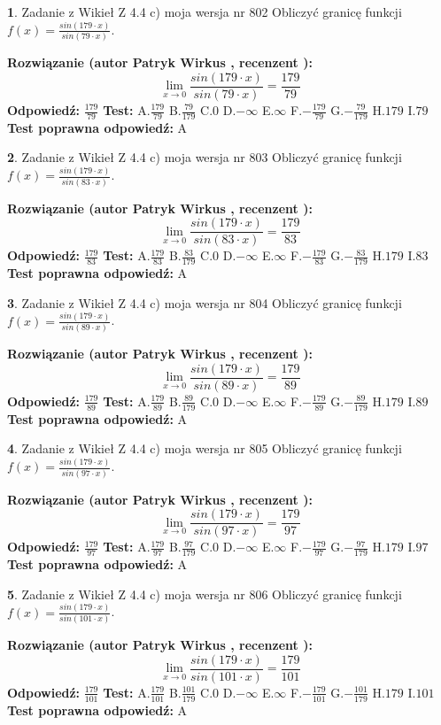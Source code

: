 \documentclass[12pt, a4paper]{article}
\theoremstyle{definition} %
\newtheorem{zad}{}
\newcommand{\zadStart}[1]{\begin{zad}#1\newline}
\newcommand{\zadStop}{\end{zad}}
\newcommand{\rozwStart}[2]{\noindent \textbf{Rozwiązanie (autor #1 , recenzent #2): }\newline}
\newcommand{\rozwStop}{\newline}
\newcommand{\odpStart}{\noindent \textbf{Odpowiedź:}\newline}
\newcommand{\odpStop}{\newline}
\newcommand{\testStart}{\noindent \textbf{Test:}\newline}
\newcommand{\testStop}{\newline}
\newcommand{\kluczStart}{\noindent \textbf{Test poprawna odpowiedź:}\newline}
\newcommand{\kluczStop}{\newline}
\begin{document}
\zadStart{Zadanie z Wikieł Z 4.4 c) moja wersja nr 802}
Obliczyć granicę funkcji $f(x)=\frac{sin(179\cdot x)}{sin(79\cdot x)}$.
\zadStop
\rozwStart{Patryk Wirkus}{}
$$\lim\limits_{x\to 0}\frac{sin(179\cdot x)}{sin(79\cdot x)}=
\frac{179}{79}$$
\rozwStop
\odpStart
$\frac{179}{79}$
\odpStop
\testStart
A.$\frac{179}{79}$
B.$\frac{79}{179}$
C.$0$
D.$-\infty$
E.$\infty$
F.$-\frac{179}{79}$
G.$-\frac{79}{179}$
H.$179$
I.$79$
\testStop
\kluczStart
A
\kluczStop



\zadStart{Zadanie z Wikieł Z 4.4 c) moja wersja nr 803}
Obliczyć granicę funkcji $f(x)=\frac{sin(179\cdot x)}{sin(83\cdot x)}$.
\zadStop
\rozwStart{Patryk Wirkus}{}
$$\lim\limits_{x\to 0}\frac{sin(179\cdot x)}{sin(83\cdot x)}=
\frac{179}{83}$$
\rozwStop
\odpStart
$\frac{179}{83}$
\odpStop
\testStart
A.$\frac{179}{83}$
B.$\frac{83}{179}$
C.$0$
D.$-\infty$
E.$\infty$
F.$-\frac{179}{83}$
G.$-\frac{83}{179}$
H.$179$
I.$83$
\testStop
\kluczStart
A
\kluczStop



\zadStart{Zadanie z Wikieł Z 4.4 c) moja wersja nr 804}
Obliczyć granicę funkcji $f(x)=\frac{sin(179\cdot x)}{sin(89\cdot x)}$.
\zadStop
\rozwStart{Patryk Wirkus}{}
$$\lim\limits_{x\to 0}\frac{sin(179\cdot x)}{sin(89\cdot x)}=
\frac{179}{89}$$
\rozwStop
\odpStart
$\frac{179}{89}$
\odpStop
\testStart
A.$\frac{179}{89}$
B.$\frac{89}{179}$
C.$0$
D.$-\infty$
E.$\infty$
F.$-\frac{179}{89}$
G.$-\frac{89}{179}$
H.$179$
I.$89$
\testStop
\kluczStart
A
\kluczStop



\zadStart{Zadanie z Wikieł Z 4.4 c) moja wersja nr 805}
Obliczyć granicę funkcji $f(x)=\frac{sin(179\cdot x)}{sin(97\cdot x)}$.
\zadStop
\rozwStart{Patryk Wirkus}{}
$$\lim\limits_{x\to 0}\frac{sin(179\cdot x)}{sin(97\cdot x)}=
\frac{179}{97}$$
\rozwStop
\odpStart
$\frac{179}{97}$
\odpStop
\testStart
A.$\frac{179}{97}$
B.$\frac{97}{179}$
C.$0$
D.$-\infty$
E.$\infty$
F.$-\frac{179}{97}$
G.$-\frac{97}{179}$
H.$179$
I.$97$
\testStop
\kluczStart
A
\kluczStop



\zadStart{Zadanie z Wikieł Z 4.4 c) moja wersja nr 806}
Obliczyć granicę funkcji $f(x)=\frac{sin(179\cdot x)}{sin(101\cdot x)}$.
\zadStop
\rozwStart{Patryk Wirkus}{}
$$\lim\limits_{x\to 0}\frac{sin(179\cdot x)}{sin(101\cdot x)}=
\frac{179}{101}$$
\rozwStop
\odpStart
$\frac{179}{101}$
\odpStop
\testStart
A.$\frac{179}{101}$
B.$\frac{101}{179}$
C.$0$
D.$-\infty$
E.$\infty$
F.$-\frac{179}{101}$
G.$-\frac{101}{179}$
H.$179$
I.$101$
\testStop
\kluczStart
A
\kluczStop
\end{document}
